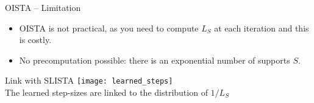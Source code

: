 \documentclass{beamer}
\begin{document}



\begin{frame}{OISTA -- Limitation}

\begin{itemize}
    \item OISTA is not practical, as you need to compute $L_S$ at each iteration and this is costly.\\[1em]
    \item No precomputation possible: there is an exponential number of supports $S$.
\end{itemize}

\end{frame}


\begin{frame}{Link with SLISTA}
    \centering
    \texttt{[image: learned\_steps]}\\
    The learned step-sizes are linked to the distribution of $1/L_S$\\[2em]

\end{frame}
\end{document}
